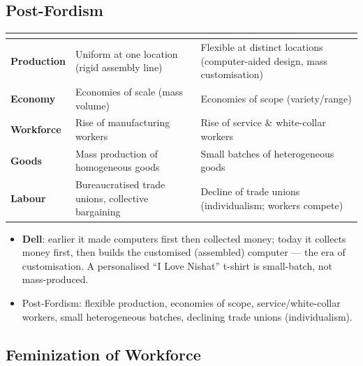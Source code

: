 \sectiondivider

\subsection{Post-Fordism}

\begin{ComparisonBox}
\begin{tabularx}{\linewidth}{>{\bfseries}lYY}
 &  &  \\
\midrule
Production & Uniform at one location (rigid assembly line) & Flexible at distinct locations (computer-aided design, mass customisation) \\
Economy & Economies of scale (mass volume) & Economies of scope (variety/range) \\
Workforce & Rise of manufacturing workers & Rise of service \& white-collar workers \\
Goods & Mass production of homogeneous goods & Small batches of heterogeneous goods \\
Labour & Bureaucratised trade unions, collective bargaining & Decline of trade unions (individualism; workers compete) \\
\bottomrule
\end{tabularx}
\end{ComparisonBox}

\begin{ExampleBox}
\begin{itemize}
    \item \textbf{Dell}: earlier it made computers first then collected money; today it collects money first, then builds the customised (assembled) computer --- the era of customisation. A personalised ``I Love Nishat'' t-shirt is small-batch, not mass-produced.
\end{itemize}
\end{ExampleBox}

\begin{QuickRevision}
\begin{itemize}
    \item Post-Fordism: flexible production, economies of scope, service/white-collar workers, small heterogeneous batches, declining trade unions (individualism).
\end{itemize}
\end{QuickRevision}

\sectiondivider

\subsection{Feminization of Workforce}

